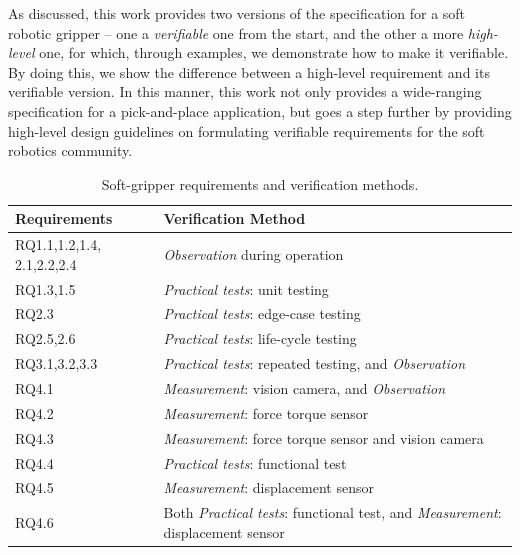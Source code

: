 \documentclass[letterpaper, 10 pt, conference]{ieeeconf}  %
\begin{document}
	As discussed, this work provides two versions of the specification for a soft robotic gripper -- one a \emph{verifiable} one from the start, and the other a more \emph{high-level} one, for which, through examples, we demonstrate how to make it verifiable. 
	By doing this, we show the difference between a high-level requirement and its verifiable version. 
	In this manner, this work not only provides a wide-ranging specification for a pick-and-place application, but goes a step further by providing high-level design guidelines on formulating verifiable requirements for the soft robotics community. %
	
	\begin{table}%
		\centering
		\caption{\label{Table:Verifiability} Soft-gripper requirements and verification methods.}
		\begin{tabular}{|p{16mm}|p{65mm}|}
			\hline
			\textbf{Requirements} & \textbf{Verification Method} \\ 
			\hline
			RQ1.1,1.2,1.4, 2.1,2.2,2.4 & \emph{Observation} during operation\\%
			\hline
			RQ1.3,1.5 & \emph{Practical tests}: unit testing  \\
			\hline
			RQ2.3 & \emph{Practical tests}: edge-case testing \\
			\hline
			RQ2.5,2.6 & \emph{Practical tests}: life-cycle testing \\
			\hline
			RQ3.1,3.2,3.3 & \emph{Practical tests}: repeated testing, and \emph{Observation} \\
			\hline
			RQ4.1 & \emph{Measurement}: vision camera, and \emph{Observation}  \\ 
			\hline
			RQ4.2 & \emph{Measurement}: force torque sensor \\ 
			\hline
			RQ4.3 & \emph{Measurement}: force torque sensor and vision camera  \\ 
			\hline
			RQ4.4 & \emph{Practical tests}: functional test\\ 
			\hline
			RQ4.5 & \emph{Measurement}: displacement sensor   \\ 
			\hline
			RQ4.6 & Both \emph{Practical tests}: functional test, and \emph{Measurement}: displacement sensor \\ 
			\hline
		\end{tabular}\vspace{-2.7ex}
	\end{table}
\end{document}
